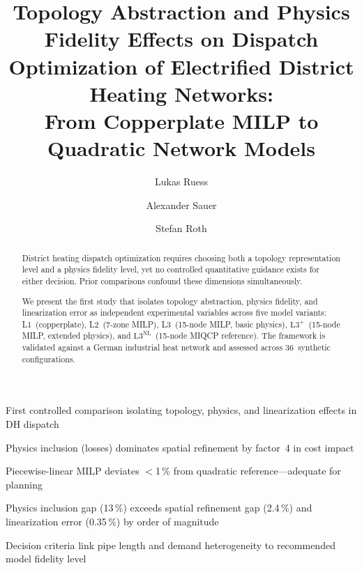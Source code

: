 \documentclass[review,3p]{elsarticle}
\newcommand{\Lplus}{\mathrm{L3}^{+}}
\newcommand{\Lnl}{\mathrm{L3}^{\mathrm{NL}}}
\begin{document}
\begin{frontmatter}

\title{Topology Abstraction and Physics Fidelity Effects on Dispatch
Optimization of Electrified District Heating Networks:\\
From Copperplate MILP to Quadratic Network Models}

\author[IPA]{Lukas Ruess}
\author[EEP]{Alexander Sauer}
\author[e-con]{Stefan Roth}


\address[IPA]{Fraunhofer-Institut für Produktionstechnik und Automatisierung, Stuttgart, Germany}
\address[EEP]{Institut für Energieeffizienz in der Produktion, Stuttgart, Germany}
\address[e-con]{e-con AG, Memmingen, Germany}


\begin{highlights}
  \item First controlled comparison isolating topology, physics, and
        linearization effects in DH dispatch
  \item Physics inclusion (losses) dominates spatial refinement by
        factor~4 in cost impact
  \item Piecewise-linear MILP deviates $<$1\,\% from
        quadratic reference---adequate for planning
  \item Physics inclusion gap (13\,\%) exceeds spatial refinement gap
        (2.4\,\%) and linearization error (0.35\,\%) by order of magnitude
  \item Decision criteria link pipe length and demand heterogeneity
        to recommended model fidelity level
\end{highlights}

\begin{abstract}
District heating dispatch optimization requires choosing both a
topology representation level and a physics fidelity level, yet no
controlled quantitative guidance exists for either decision. Prior
comparisons confound these dimensions simultaneously.

We present the first study that isolates topology abstraction,
physics fidelity, and linearization error as independent experimental
variables across five model variants: L1~(copperplate), L2~(7-zone
MILP), L3~(15-node MILP, basic physics), $\Lplus$~(15-node MILP,
extended physics), and $\Lnl$~(15-node MIQCP reference). The
framework is validated against a German industrial heat network and
assessed across 36~synthetic configurations.


\end{abstract}
\end{frontmatter}
\end{document}
